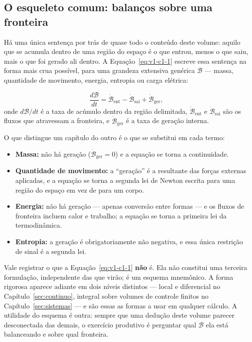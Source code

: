 \documentclass[12pt,a4paper]{article}
\numberwithin{equation}{section}
\numberwithin{table}{section}
\numberwithin{figure}{section}
\begin{document}
\subsection{O esqueleto comum: balanços sobre uma fronteira}

Há uma única sentença por trás de quase todo o conteúdo deste volume: aquilo
que se acumula dentro de uma região do espaço é o que entrou, menos o que
saiu, mais o que foi gerado ali dentro. A Equação~\eqref{eq:v1-c1-1} escreve
essa sentença na forma mais crua possível, para uma grandeza extensiva
genérica $\mathcal{B}$ --- massa, quantidade de movimento, energia, entropia
ou carga elétrica:

\begin{equation}\label{eq:v1-c1-1}
\frac{d\mathcal{B}}{dt} = \dot{\mathcal{B}}_{\text{ent}} -
\dot{\mathcal{B}}_{\text{sai}} + \dot{\mathcal{B}}_{\text{ger}},
\end{equation}
onde $d\mathcal{B}/dt$ é a taxa de acúmulo dentro da região delimitada,
$\dot{\mathcal{B}}_{\text{ent}}$ e $\dot{\mathcal{B}}_{\text{sai}}$ são os
fluxos que atravessam a fronteira, e $\dot{\mathcal{B}}_{\text{ger}}$ é a taxa
de geração interna.

O que distingue um capítulo do outro é o que se substitui em cada termo:

\begin{itemize}
	\item \textbf{Massa:} não há geração ($\dot{\mathcal{B}}_{\text{ger}}=0$) e
	a equação se torna a continuidade.
	\item \textbf{Quantidade de movimento:} a ``geração'' é a resultante das
	forças externas aplicadas, e a equação se torna a segunda lei de Newton
	escrita para uma região do espaço em vez de para um corpo.
	\item \textbf{Energia:} não há geração --- apenas conversão entre formas
	--- e os fluxos de fronteira incluem calor e trabalho; a equação se torna a
	primeira lei da termodinâmica.
	\item \textbf{Entropia:} a geração é obrigatoriamente não negativa, e essa
	única restrição de sinal é a segunda lei.
\end{itemize}

Vale registrar o que a Equação~\eqref{eq:v1-c1-1} \textbf{não} é. Ela não
constitui uma terceira formulação, independente das que virão; é um esquema
mnemônico. A forma rigorosa aparece adiante em dois níveis distintos ---
local e diferencial no Capítulo~\ref{sec:continuo}, integral sobre volumes de
controle finitos no Capítulo~\ref{sec:sistemas} --- e são essas as formas a
usar em qualquer cálculo. A utilidade do esquema é outra: sempre que uma
dedução deste volume parecer desconectada das demais, o exercício produtivo é
perguntar qual $\mathcal{B}$ ela está balanceando e sobre qual fronteira.
\end{document}
